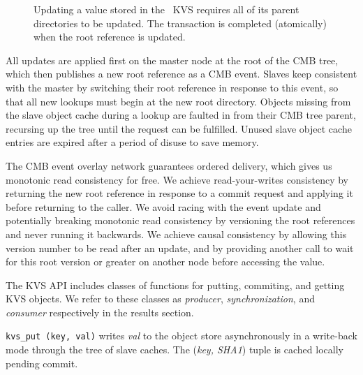 \begin{figure}[ht]
\centering
\begin{subfigure}[a.b.c = 42.]{
  \label{fig:kvsupdate1}
}%
\end{subfigure}\hfill
\begin{subfigure}[a.b.c = 43 in progress.]{
  \label{fig:kvsupdate2}
}%
\end{subfigure}\hfill
\begin{subfigure}[a.b.c = 43 committed.]{
  \label{fig:kvsupdate3}
}%
\end{subfigure}\hfill
\caption{Updating a value stored in the \flux\ KVS requires all of its
parent directories to be updated.  The transaction is completed
(atomically) when the root reference is updated.}
\label{fig:kvsupdate}
\end{figure}

All updates are applied first on the master node at the root of the
CMB tree, which then publishes a new root reference as a CMB event.
Slaves keep consistent with the master by switching their root reference
in response to this event, so that all new lookups must begin at the
new root directory.  Objects missing from the slave object cache during
a lookup are faulted in from their CMB tree parent, recursing up the tree
until the request can be fulfilled.  Unused slave object cache entries are
expired after a period of disuse to save memory.

The CMB event overlay network guarantees ordered delivery, which gives
us monotonic read consistency for free.  We achieve read-your-writes
consistency by returning the new root reference in response to a commit
request and applying it before returning to the caller.  We avoid
racing with the event update and potentially breaking monotonic read
consistency by versioning the root references and never running it
backwards.  We achieve causal consistency by allowing this version number
to be read after an update, and by providing another call to wait for this
root version or greater on another node before accessing the value.

The KVS API includes classes of functions for putting, commiting, and
getting KVS objects.  We refer to these classes as
{\em producer}, {\em synchronization}, and {\em consumer} respectively
in the results section.

{\tt kvs\_put (key, val)}
writes {\em val} to the object store asynchronously in a write-back
mode through the tree of slave caches.
The ({\em key, SHA1}) tuple is cached locally pending commit.

